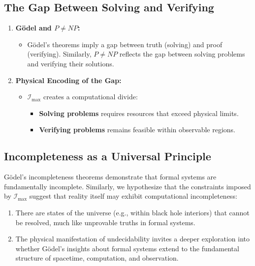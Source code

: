 \documentclass[12pt]{article}
\begin{document}
\subsection{The Gap Between Solving and Verifying}

\begin{enumerate}
    \item \textbf{Gödel and $P \neq NP$:}
    \begin{itemize}
        \item Gödel’s theorems imply a gap between truth (solving) and proof (verifying). Similarly, $P \neq NP$ reflects the gap between solving problems and verifying their solutions.
    \end{itemize}

    \item \textbf{Physical Encoding of the Gap:}
    \begin{itemize}
        \item $\mathcal{I}_{\text{max}}$ creates a computational divide:
        \begin{itemize}
            \item \textbf{Solving problems} requires resources that exceed physical limits.
            \item \textbf{Verifying problems} remains feasible within observable regions.
        \end{itemize}
    \end{itemize}
\end{enumerate}

\subsection{Incompleteness as a Universal Principle}

Gödel’s incompleteness theorems demonstrate that formal systems are fundamentally incomplete. Similarly, we hypothesize that the constraints imposed by $\mathcal{I}_{\text{max}}$ suggest that reality itself may exhibit computational incompleteness:
\begin{enumerate}
    \item There are states of the universe (e.g., within black hole interiors) that cannot be resolved, much like unprovable truths in formal systems.

    \item The physical manifestation of undecidability invites a deeper exploration into whether Gödel’s insights about formal systems extend to the fundamental structure of spacetime, computation, and observation.
\end{enumerate}
\end{document}
